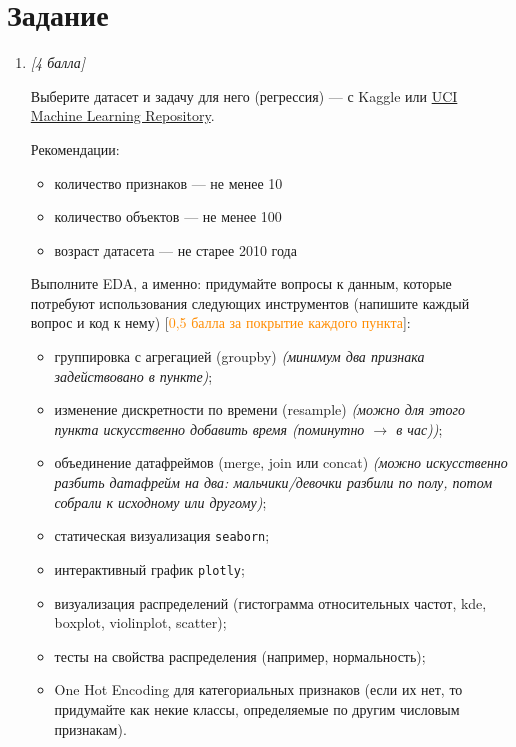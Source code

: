 \section{Задание}

\begin{enumerate}[label=\textbf{Task \arabic*:}, leftmargin=*]

\item \textit{[4 балла]}

Выберите датасет и задачу для него (регрессия) --- с Kaggle или \href{https://archive.ics.uci.edu/datasets}{UCI Machine Learning Repository}.

Рекомендации:
\begin{itemize}
    \item количество признаков --- не менее 10
    \item количество объектов --- не менее 100
    \item возраст датасета --- не старее 2010 года
\end{itemize}

Выполните EDA, а именно: придумайте вопросы к данным, которые потребуют использования следующих инструментов (напишите каждый вопрос и код к нему) [\textcolor{DarkOrange}{0,5 балла за покрытие каждого пункта}]:
\begin{itemize}
    \item группировка с агрегацией (groupby) \textit{(минимум два признака задействовано в пункте)};
    \item изменение дискретности по времени (resample) \textit{(можно для этого пункта искусственно добавить время (поминутно $\rightarrow$ в час))};
    \item объединение датафреймов (merge, join или concat) \textit{(можно искусственно разбить датафрейм на два: мальчики/девочки разбили по полу, потом собрали к исходному или другому)};
    \item статическая визуализация \texttt{seaborn};
    \item интерактивный график \texttt{plotly};
    \item визуализация распределений (гистограмма относительных частот, kde, boxplot, violinplot, scatter);
    \item тесты на свойства распределения (например, нормальность);
    \item One Hot Encoding для категориальных признаков (если их нет, то придумайте как некие классы, определяемые по другим числовым признакам).
\end{itemize}


\end{enumerate}
